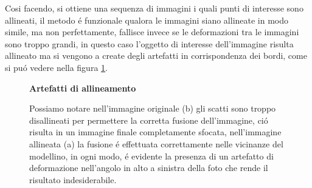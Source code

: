 \documentclass[10pt,journal,cspaper,compsoc]{IEEEtran}
\newcommand*{\figuretitle}[1]{%
    {\centering%
    \textbf{#1}%
    \par\medskip}%
}
\begin{document}
Cosi facendo, si ottiene una sequenza di immagini i quali punti di interesse sono allineati,
il metodo é funzionale qualora le immagini siano allineate in modo simile, ma non perfettamente, 
fallisce invece se le deformazioni tra le immagini sono troppo grandi, in questo caso l'oggetto 
di interesse dell'immagine risulta allineato ma si vengono a create degli artefatti in corrispondenza
dei bordi, come si puó vedere nella figura \ref{fig:align_crusader}.

\begin{figure}[ht]
    \centering
    \figuretitle{Artefatti di allineamento}
    \caption[Commento.]{Possiamo notare nell'immagine originale (b) gli scatti sono troppo disallineati 
    per permettere la corretta fusione dell'immagine, ció risulta in un immagine finale 
    completamente sfocata, nell'immagine allineata (a) la fusione é effettuata correttamente 
    nelle vicinanze del modellino, in ogni modo, é evidente la presenza di un artefatto di deformazione 
    nell'angolo in alto a sinistra della foto che rende il risultato indesiderabile.}\label{fig:align_crusader}
\end{figure}
\end{document}
